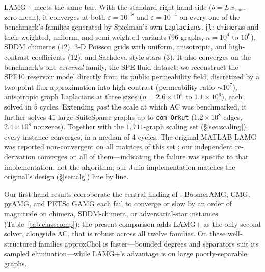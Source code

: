 \documentclass[review]{siamart220329}
\begin{document}
LAMG+ meets the same bar. With the standard right-hand side ($b=L\,x_{\mathrm{true}}$, zero-mean), it
converges at both $\varepsilon=10^{-8}$ and $\varepsilon=10^{-4}$ on every one of the benchmark's families generated by
Spielman's own \texttt{Laplacians.jl}: \texttt{chimera}s and their weighted, uniform, and
semi-weighted variants ($96$ graphs, $n=10^4$ to $10^6$), SDDM chimeras ($12$), $3$-D Poisson grids
with uniform, anisotropic, and high-contrast coefficients ($12$), and Sachdeva-style stars ($3$). It
also converges on the benchmark's one \emph{external} family, the SPE fluid dataset: we reconstruct
the SPE10 reservoir model \cite{christie-blunt} directly from its public permeability field,
discretized by a two-point flux approximation into high-contrast (permeability ratio ${\sim}10^7$),
anisotropic graph Laplacians at three sizes ($n=2.6\times10^5$ to $1.1\times10^6$), each solved in
$5$ cycles. Extending \emph{past} the scale at which AC was benchmarked, it further solves $41$ large
SuiteSparse graphs up to \texttt{com-Orkut} ($1.2\times10^8$ edges, $2.4\times10^8$ nonzeros).
Together with the $1{,}711$-graph scaling set (\S\ref{sec:scaling}), every instance converges, in a
median of $4$ cycles. The original MATLAB LAMG was reported non-convergent on all matrices of this set
\cite{gks2023}; our independent re-derivation converges on all of them---indicating the failure was
specific to that implementation, not the algorithm; our Julia implementation matches the original's design
(\S\ref{sec:alg}) line by line.

Our first-hand results corroborate the central finding of \cite{gks2023}: BoomerAMG, CMG, pyAMG,
and PETSc GAMG each fail to converge or slow by an order of magnitude on chimera, SDDM-chimera, or
adversarial-star instances (Table~\ref{tab:classcomp}); the present comparison adds LAMG+ as the
only second solver, alongside AC, that is robust across all twelve families. On these well-structured families approxChol is faster---bounded degrees and separators
suit its sampled elimination---while LAMG+'s advantage is on large poorly-separable graphs.
\end{document}
